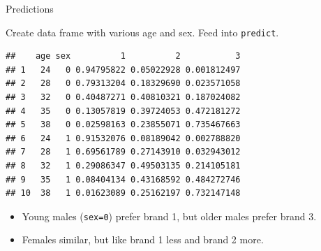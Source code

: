 \begin{frame}[fragile]{Predictions}

Create data frame with various age and sex. Feed into \texttt{predict}.

{\footnotesize
 
\begin{knitrout}
\color{fgcolor}\begin{kframe}
\begin{alltt}
\hlkwb{=}\hlstd{(}\hlstd{=}\hlstd{(}\hlstd{,}\hlstd{,}\hlstd{,}\hlstd{,}\hlstd{),}\hlstd{=}\hlstd{(}\hlopt{:}\hlstd{))}
\hlkwb{=}\hlstd{=}\hlstd{)}
\hlkwb{=}
\end{alltt}
\begin{verbatim}
##    age sex          1          2           3
## 1   24   0 0.94795822 0.05022928 0.001812497
## 2   28   0 0.79313204 0.18329690 0.023571058
## 3   32   0 0.40487271 0.40810321 0.187024082
## 4   35   0 0.13057819 0.39724053 0.472181272
## 5   38   0 0.02598163 0.23855071 0.735467663
## 6   24   1 0.91532076 0.08189042 0.002788820
## 7   28   1 0.69561789 0.27143910 0.032943012
## 8   32   1 0.29086347 0.49503135 0.214105181
## 9   35   1 0.08404134 0.43168592 0.484272746
## 10  38   1 0.01623089 0.25162197 0.732147148
\end{verbatim}
\end{kframe}
\end{knitrout}
}

\begin{itemize}
\item Young males (\texttt{sex=0}) prefer brand 1, 
but older males prefer brand 3.
\item Females similar, but like brand 1 less and
  brand 2 more.
\end{itemize}

\end{frame}

